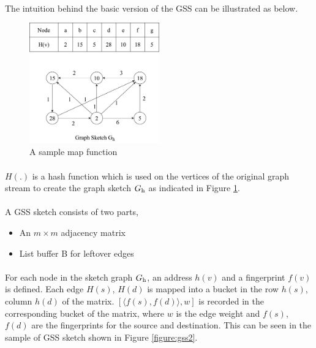 \paragraph{}
The intuition behind the basic version of the GSS\cite{gou_fast_2018} can be illustrated as below. 

\begin{figure}[H]
    \centering
    \includegraphics[width=0.5\textwidth]{images/gss1}
    \caption{A sample map function\cite{gou_fast_2018}}
    \label{figure:gss1}
\end{figure}

\paragraph{}
\(H(.)\) is a hash function which is used on the vertices of the original graph stream to create the graph sketch \(G\textsubscript{h}\) as indicated in Figure \ref{figure:gss1}.

\paragraph{}
A GSS\cite{gou_fast_2018} sketch consists of two parts, 

\begin{itemize}
    \item An \(m \times m\) adjacency matrix
    \item List buffer B for leftover edges
\end{itemize}

\paragraph{}
For each node in the sketch graph \(G\textsubscript{h}\), an address \(h(v)\) and a fingerprint \(f(v)\) is defined. Each edge \(H(s)\), \(H(d)\) is mapped into a bucket in the row \(h(s)\), column \(h(d)\) of the matrix. \([\langle f(s), f(d)\rangle, w]\) is recorded in the corresponding bucket of the matrix, where \(w\) is the edge weight and \(f(s)\), \(f(d)\) are the fingerprints for the source and destination. This can be seen in the sample of GSS sketch shown in Figure \ref{figure:gss2}.

